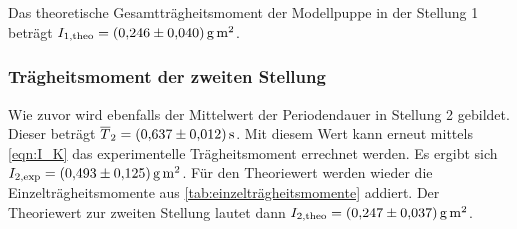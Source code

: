 Das theoretische Gesamtträgheitsmoment der Modellpuppe in der Stellung 1 beträgt $I_{1\text{,theo}} = \qty{0.246+-0.040}{\gram\metre\squared}$.
\subsubsection{Trägheitsmoment der zweiten Stellung}
\label{subsubsec:A_tpose}
Wie zuvor wird ebenfalls der Mittelwert der Periodendauer in Stellung 2 gebildet. Dieser beträgt $\overline{T}_2 = \qty{0.637+-0.012}{\second}$. Mit diesem Wert kann erneut mittels \autoref{eqn:I_K}
das experimentelle Trägheitsmoment errechnet werden. Es ergibt sich $I_{2\text{,exp}} = \qty{0.493+-0.125}{\gram\metre\squared}$. Für den Theoriewert werden wieder die Einzelträgheitsmomente aus 
\autoref{tab:einzelträgheitsmomente} addiert. Der Theoriewert zur zweiten Stellung lautet dann $I_{2\text{,theo}} = \qty{0.247+-0.037}{\gram\metre\squared}$.
